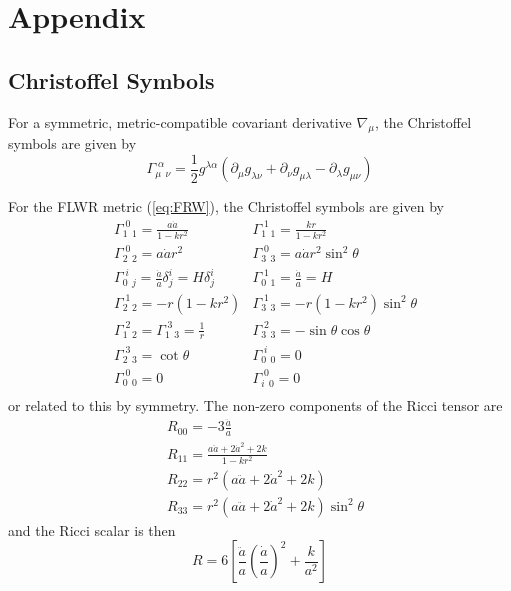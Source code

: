 \chapter{Appendix}\label{ch:appendix}

\section*{Christoffel Symbols}

\par For a symmetric, metric-compatible covariant derivative $\nabla_{\mu}$, the Christoffel symbols are given by
\begin{equation}
    \Gamma_{\mu\;\,\nu}^{\;\alpha} = \frac{1}{2}g^{\lambda\alpha}(\partial_{\mu}g_{\lambda\nu}+\partial_{\nu}g_{\mu\lambda}-\partial_{\lambda}g_{\mu\nu})
    \label{eq:christoffel}
\end{equation}
\par For the FLWR metric (\ref{eq:FRW}), the Christoffel symbols are given by
\begin{align*}
    & \Gamma_{1\;\,1}^{\;0} = \frac{a\dot{a}}{1-kr^{2}} &\Gamma_{1\;\,1}^{\;1} = \frac{kr}{1-kr^{2}} \\
    & \Gamma_{2\;\,2}^{\;0} = a\dot{a}r^{2} &\Gamma_{3\;\,3}^{\;0} = a\dot{a}r^{2}\sin^{2}\theta \\
    & \Gamma_{0\;\,j}^{\;i} = \frac{\dot{a}}{a}\delta^{i}_{j}=H\delta^{i}_{j} & \Gamma_{0\;\,1}^{\;1} = \frac{\dot{a}}{a} = H \\
    & \Gamma_{2\;\,2}^{\;1} = -r(1-kr^{2}) &\Gamma_{3\;\,3}^{\;1} = -r(1-kr^{2})\sin^{2}\theta \\
    & \Gamma_{1\;\,2}^{\;2} = \Gamma_{1\;\,3}^{\;3} = \frac{1}{r} \quad & \Gamma_{3\;\,3}^{\;2} = -\sin\theta\cos\theta\\
    &\Gamma_{2\;\,3}^{\;3} = \cot\theta  & \Gamma_{0\;\,0}^{\;i} = 0\\
    & \Gamma_{0\;\,0}^{\;0} = 0 &\Gamma_{i\;\,0}^{\;0} = 0\\
\end{align*}
or related to this by symmetry. The non-zero components of the Ricci tensor are
\begin{align*}
    & R_{00} = -3\frac{\ddot{a}}{a} \\
    & R_{11} = \frac{a\ddot{a}+2\dot{a}^{2}+2k}{1-kr^{2}}\\
    & R_{22} = r^{2}(a\ddot{a}+2\dot{a}^{2}+2k)\\
    & R_{33} = r^{2}(a\ddot{a}+2\dot{a}^{2}+2k)\sin^{2}\theta
\end{align*}
and the Ricci scalar is then
\begin{equation*}
    R = 6\left[\frac{\ddot{a}}{a}\left(\frac{\dot{a}}{a}\right)^{2}+\frac{k}{a^{2}}\right]
\end{equation*}